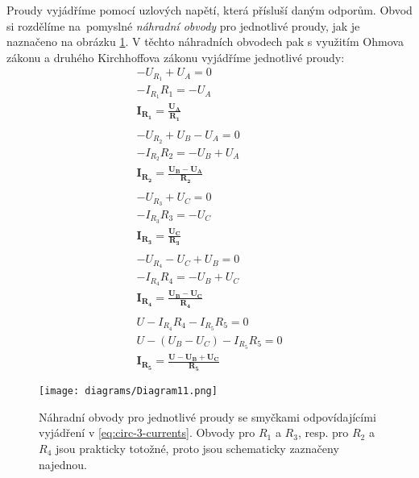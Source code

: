 Proudy vyjádříme pomocí uzlových napětí, která přísluší daným odporům. Obvod si rozdělíme na~pomyslné \textit{náhradní obvody} pro jednotlivé proudy, jak je naznačeno na obrázku \ref{fig:circ-3-2}. V těchto náhradních obvodech pak s využitím Ohmova zákonu a druhého Kirchhoffova zákonu vyjádříme jednotlivé proudy:
\begin{equation}\label{eq:circ-3-currents}
\begin{gathered}
    -U_{R_1} + U_A = 0 \\
    -I_{R_1} R_1 = -U_A \\
    \mathbf{I_{R_1} = \frac{U_A}{R_1}} \\
    \\
    -U_{R_2} + U_B - U_A = 0 \\
    -I_{R_2} R_2 = -U_B + U_A \\
    \mathbf{I_{R_2} = \frac{U_B - U_A}{R_2}} \\
    \\
    -U_{R_3} + U_C = 0 \\
    -I_{R_3} R_3 = -U_C \\
    \mathbf{I_{R_3} = \frac{U_C}{R_3}} \\
    \\
    -U_{R_4} - U_C + U_B = 0 \\
    -I_{R_4} R_4 = -U_B + U_C \\
    \mathbf{I_{R_4} = \frac{U_B - U_C}{R_4}} \\
    \\
    U - I_{R_4} R_4 - I_{R_5} R_5 = 0 \\
    U - (U_B - U_C) - I_{R_5} R_5 = 0 \\
    \mathbf{I_{R_5} = \frac{U - U_B + U_C}{R_5}}
\end{gathered}
\end{equation}
\begin{figure}[ht]
    \centering
    \texttt{[image: diagrams/Diagram11.png]}
    \caption{Náhradní obvody pro jednotlivé proudy se smyčkami odpovídajícími vyjádření v \eqref{eq:circ-3-currents}. Obvody pro $R_1$ a $R_3$, resp. pro $R_2$ a $R_4$ jsou prakticky totožné, proto jsou schematicky zaznačeny najednou.}
    \label{fig:circ-3-2}
\end{figure}


